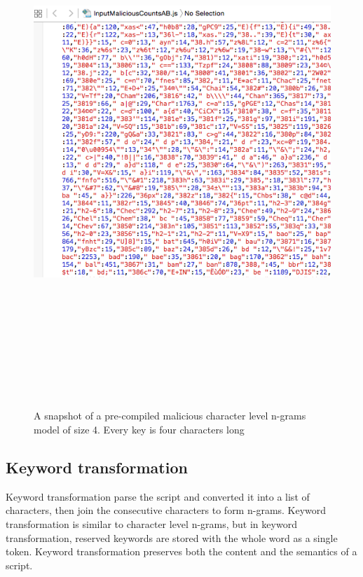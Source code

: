 \begin{figure}[htb]
\centering
\includegraphics[width=16cm,height=20cm,keepaspectratio]{image/character.png}
\caption[A snapshot of a pre-compiled malicious character level n-grams model]{A snapshot of a pre-compiled malicious character level n-grams model of size 4. Every key is four characters long} 
\label{fig:character}
\end{figure}

\subsection{Keyword transformation}

Keyword transformation parse the script and converted it into a list of characters, then join the consecutive characters to form n-grams. Keyword transformation is similar to character level n-grams, but in keyword transformation, reserved keywords are stored with the whole word as a single token. Keyword transformation preserves both the content and the semantics of a script.

